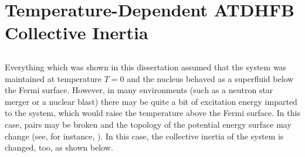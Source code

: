 \chapter{Temperature-Dependent ATDHFB Collective Inertia}%


\section{}\label{append:TD-ATDHFB}
Everything which was shown in this dissertation assumed that the system was maintained at temperature $T=0$ and the nucleus behaved as a superfluid below the Fermi surface. However, in many environments (such as a neutron star merger or a nuclear blast) there may be quite a bit of excitation energy imparted to the system, which would raise the temperature above the Fermi surface. In this case, pairs may be broken and the topology of the potential energy surface may change (see, for instance, \cite{Mcdonnell2014}). In this case, the collective inertia of the system is changed, too, as shown below.